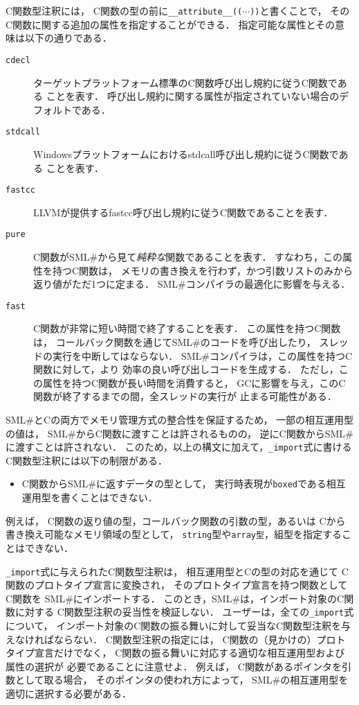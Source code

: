 \documentclass{jbook}
\newcommand{\smlsharp}{SML\#}
\begin{document}
	C関数型注釈には，
C関数の型の前に{\tt \_\_attribute\_\_(($\cdots$))}と書くことで，
そのC関数に関する追加の属性を指定することができる．
	指定可能な属性とその意味は以下の通りである．
\begin{description}
\item[{\tt cdecl}]
	ターゲットプラットフォーム標準のC関数呼び出し規約に従うC関数である
ことを表す．
	呼び出し規約に関する属性が指定されていない場合のデフォルトである．
\item[{\tt stdcall}]
	Windowsプラットフォームにおけるstdcall呼び出し規約に従うC関数である
ことを表す．
\item[{\tt fastcc}]
	LLVMが提供するfastcc呼び出し規約に従うC関数であることを表す．
\item[{\tt pure}]
	C関数が\smlsharp{}から見て{\em 純粋な}関数であることを表す．
	すなわち，この属性を持つC関数は，
メモリの書き換えを行わず，かつ引数リストのみから返り値がただ1つに定まる．
	\smlsharp{}コンパイラの最適化に影響を与える．
\item[{\tt fast}]
	C関数が非常に短い時間で終了することを表す．
	この属性を持つC関数は，
コールバック関数を通じて\smlsharp{}のコードを呼び出したり，
スレッドの実行を中断してはならない．
	\smlsharp{}コンパイラは，この属性を持つC関数に対して，より
効率の良い呼び出しコードを生成する．
	ただし，この属性を持つC関数が長い時間を消費すると，
GCに影響を与え，このC関数が終了するまでの間，全スレッドの実行が
止まる可能性がある．
\end{description}

	\smlsharp{}とCの両方でメモリ管理方式の整合性を保証するため，
一部の相互運用型の値は，
\smlsharp{}からC関数に渡すことは許されるものの，
逆にC関数から\smlsharp{}に渡すことは許されない．
	このため，以上の構文に加えて，{\tt \_import}式に書ける
C関数型注釈には以下の制限がある．
\begin{itemize}
\item
	C関数から\smlsharp{}に返すデータの型として，
実行時表現が{\tt boxed}である相互運用型を書くことはできない．
\end{itemize}
	例えば，
C関数の返り値の型，コールバック関数の引数の型，あるいは
Cから書き換え可能なメモリ領域の型として，
{\tt string}型や{\tt array型}，組型を指定することはできない．

	{\tt \_import}式に与えられたC関数型注釈は，
相互運用型とCの型の対応を通じて
C関数のプロトタイプ宣言に変換され，
そのプロトタイプ宣言を持つ関数としてC関数を
\smlsharp{}にインポートする．
	このとき，\smlsharp{}は，インポート対象のC関数に対する
C関数型注釈の妥当性を検証しない．
	ユーザーは，全ての{\tt \_import}式について，
インポート対象のC関数の振る舞いに対して妥当なC関数型注釈を与えなければならない．
	C関数型注釈の指定には，
C関数の（見かけの）プロトタイプ宣言だけでなく，
C関数の振る舞いに対応する適切な相互運用型および属性の選択が
必要であることに注意せよ．
	例えば，
C関数があるポインタを引数として取る場合，
そのポインタの使われ方によって，
\smlsharp{}の相互運用型を適切に選択する必要がある．
\end{document}
